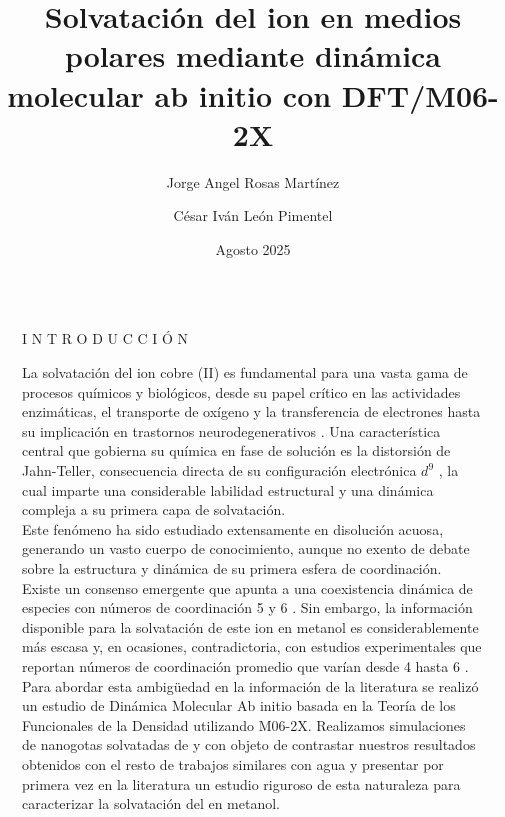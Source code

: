 \documentclass[final]{beamer}
\title{Solvatación del ion \ce{Cu^{2+}} en medios polares mediante dinámica molecular ab initio con DFT/M06-2X}
\author{Jorge Angel Rosas Martínez \inst{1} \and César Iván León Pimentel \inst{2}}
\institute[shortinst]{\inst{1} Facultad de Química, UNAM \inst{2} Depto. de Matemáticas, Facultad de Química, UNAM}
\date{Agosto 2025}
\newlength{\sepwidth}
\newlength{\colwidth}
\newcommand{\separatorcolumn}{\begin{column}{\sepwidth}\end{column}}
\begin{document}
	
\begin{frame}[t]
	
	\begin{columns}[t]
		\separatorcolumn

		\begin{column}{\colwidth}
			\begin{block}{I N T R O D U C C I Ó N}

				\justifying

				La solvatación del ion cobre (II)  es fundamental para una vasta gama de procesos químicos y biológicos, desde su papel crítico en las actividades enzimáticas, el transporte de oxígeno y la transferencia de electrones \cite{Wa-2023-01, Wa-2024-03} hasta su implicación en trastornos neurodegenerativos \cite{Cu-2014-02}. Una característica central que gobierna su química en fase de solución es la distorsión de Jahn-Teller, consecuencia directa de su configuración electrónica $d^9$ \cite{Cu-2019-01}, la cual imparte una considerable labilidad estructural y una dinámica compleja a su primera capa de solvatación.\\ Este fenómeno ha sido estudiado extensamente en disolución acuosa, generando un vasto cuerpo de conocimiento, aunque no exento de debate sobre la estructura y dinámica de su primera esfera de coordinación. Existe un consenso emergente que apunta a una coexistencia dinámica de especies con números de coordinación 5 y 6 \cite{Wa-2023-01}. Sin embargo, la información disponible para la solvatación de este ion en metanol es considerablemente más escasa y, en ocasiones, contradictoria, con estudios experimentales que reportan números de coordinación promedio que varían desde 4 hasta 6 \cite{Me-2025-01}. \\ Para abordar esta ambigüedad en la información de la literatura se realizó un estudio de Dinámica Molecular Ab initio basada en la Teoría de los Funcionales de la Densidad utilizando M06-2X. Realizamos simulaciones de nanogotas solvatadas de  y  con objeto de contrastar nuestros resultados obtenidos con el resto de trabajos similares con agua y presentar por primera vez en la literatura un estudio riguroso de esta naturaleza para caracterizar la solvatación del  en metanol.


			\end{block}

		\end{column}

		\separatorcolumn


\end{columns}
\end{frame}
\end{document}

